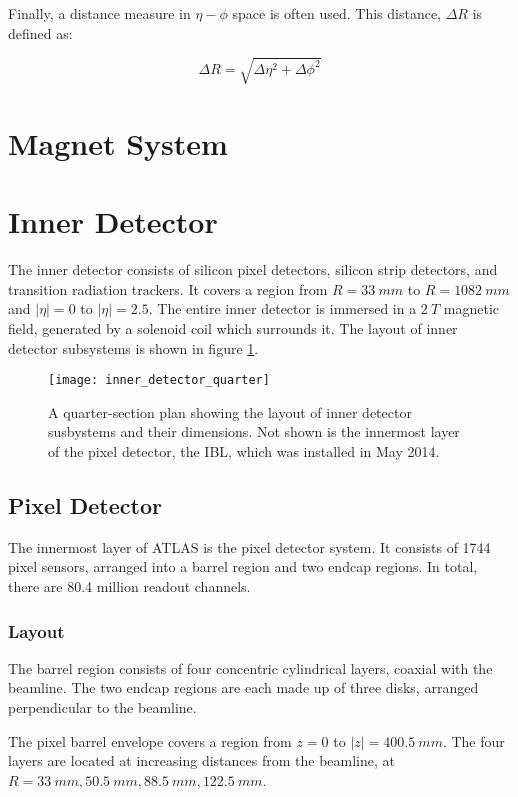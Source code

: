 Finally, a distance measure in $\eta-\phi$ space is often used. This
distance, $\Delta R$ is defined as:

\begin{equation}
\Delta R = \sqrt{\Delta\eta^2+\Delta\phi^2}
\end{equation}

\section{Magnet System}

\section{Inner Detector}

The inner detector consists of silicon pixel detectors, silicon strip
detectors, and transition radiation trackers. It covers a region from
$R = 33~mm$ to $R = 1082~mm$ and $|\eta| = 0$ to $|\eta| = 2.5$. The entire inner
detector is immersed in a $2~T$ magnetic field, generated by a
solenoid coil which surrounds it. The layout of inner detector
subsystems is shown in figure \ref{fig:inner_detector_quarter}.

\begin{figure}[h]
\texttt{[image: inner\_detector\_quarter]}
\caption{A quarter-section plan showing the layout of inner detector
  susbystems and their dimensions. Not shown is the innermost layer of
the pixel detector, the IBL, which was installed in May 2014.}
\label{fig:inner_detector_quarter}
\end{figure}

\subsection{Pixel Detector}

The innermost layer of ATLAS is the pixel detector system. It consists
of 1744 pixel sensors, arranged into a barrel region and two endcap
regions. In total, there are 80.4 million readout channels.

\subsubsection{Layout}
The barrel region consists of four
concentric cylindrical layers, coaxial with the beamline. The two endcap regions are each made up
of three disks, arranged perpendicular to the beamline.

The pixel barrel envelope covers a region
from $z = 0$ to $|z|  = 400.5~mm$. The four layers are located at
increasing distances from the beamline, at $R = 33~mm, 50.5~mm,
88.5~mm, 122.5~mm$.

